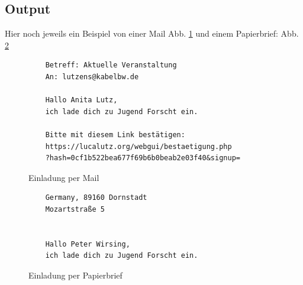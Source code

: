 \documentclass[12pt,twoside]{article}  %
\begin{document}
    \subsection{Output}
Hier noch jeweils ein Beispiel von einer Mail Abb. \ref{MailEinladung} und einem Papierbrief: Abb. \ref{PaierbriefEinladung}\\
\begin{figure}
    \begin{verbatim}
    Betreff: Aktuelle Veranstaltung
    An: lutzens@kabelbw.de  

    Hallo Anita Lutz, 
    ich lade dich zu Jugend Forscht ein.

    Bitte mit diesem Link bestätigen:
    https://lucalutz.org/webgui/bestaetigung.php
    ?hash=0cf1b522bea677f69b6b0beab2e03f40&signup= 
    \end{verbatim}
    \caption{Einladung per Mail \label{MailEinladung}}
\end{figure}

\begin{figure}
    \begin{verbatim}
    Germany, 89160 Dornstadt
    Mozartstraße 5


    Hallo Peter Wirsing,
    ich lade dich zu Jugend Forscht ein.
    \end{verbatim}
    \caption{Einladung per Papierbrief \label{PaierbriefEinladung}}
\end{figure}
\end{document}
